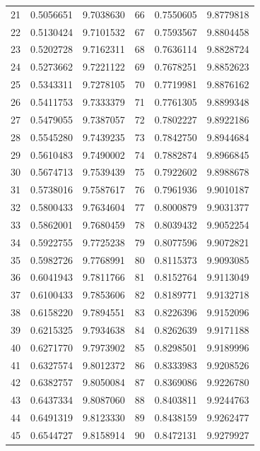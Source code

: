 \begin{center}
\begin{tabular}{||r|r|r||r|r|r||}
21 & 0.5056651 & 9.7038630 & 66 & 0.7550605 & 9.8779818 \\
22 & 0.5130424 & 9.7101532 & 67 & 0.7593567 & 9.8804458 \\
23 & 0.5202728 & 9.7162311 & 68 & 0.7636114 & 9.8828724 \\
24 & 0.5273662 & 9.7221122 & 69 & 0.7678251 & 9.8852623 \\
25 & 0.5343311 & 9.7278105 & 70 & 0.7719981 & 9.8876162 \\[3pt]
26 & 0.5411753 & 9.7333379 & 71 & 0.7761305 & 9.8899348 \\
27 & 0.5479055 & 9.7387057 & 72 & 0.7802227 & 9.8922186 \\
28 & 0.5545280 & 9.7439235 & 73 & 0.7842750 & 9.8944684 \\
29 & 0.5610483 & 9.7490002 & 74 & 0.7882874 & 9.8966845 \\
30 & 0.5674713 & 9.7539439 & 75 & 0.7922602 & 9.8988678 \\[3pt]
31 & 0.5738016 & 9.7587617 & 76 & 0.7961936 & 9.9010187 \\
32 & 0.5800433 & 9.7634604 & 77 & 0.8000879 & 9.9031377 \\
33 & 0.5862001 & 9.7680459 & 78 & 0.8039432 & 9.9052254 \\
34 & 0.5922755 & 9.7725238 & 79 & 0.8077596 & 9.9072821 \\
35 & 0.5982726 & 9.7768991 & 80 & 0.8115373 & 9.9093085 \\[3pt]
36 & 0.6041943 & 9.7811766 & 81 & 0.8152764 & 9.9113049 \\
37 & 0.6100433 & 9.7853606 & 82 & 0.8189771 & 9.9132718 \\
38 & 0.6158220 & 9.7894551 & 83 & 0.8226396 & 9.9152096 \\
39 & 0.6215325 & 9.7934638 & 84 & 0.8262639 & 9.9171188 \\
40 & 0.6271770 & 9.7973902 & 85 & 0.8298501 & 9.9189996 \\[3pt]
41 & 0.6327574 & 9.8012372 & 86 & 0.8333983 & 9.9208526 \\
42 & 0.6382757 & 9.8050084 & 87 & 0.8369086 & 9.9226780 \\
43 & 0.6437334 & 9.8087060 & 88 & 0.8403811 & 9.9244763 \\
44 & 0.6491319 & 9.8123330 & 89 & 0.8438159 & 9.9262477 \\
45 & 0.6544727 & 9.8158914 & 90 & 0.8472131 & 9.9279927 \\
\hline\hline\end{tabular}\endgroup\end{center}
